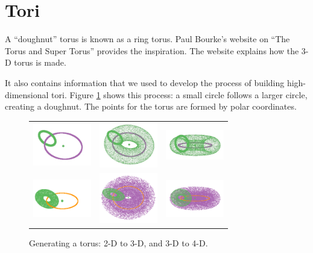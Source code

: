 \section{Tori}

A ``doughnut'' torus is known as a ring torus. Paul Bourke's website
\citep{Pa90} on ``The Torus and Super Torus'' provides the
inspiration. The website explains how the 3-D torus is made.

It also contains information that we used to develop the process of
building high-dimensional tori.  Figure \ref{ringtorus} shows this
process: a small circle follows a larger circle, creating a
doughnut. The points for the torus are formed by polar coordinates.

\begin{figure}[ht]
\centering
\begin{tabular}{c c c}
\includegraphics[width=1in]{fig/torus-ring-3-2nd-1.pdf} & \includegraphics[width=1in]{fig/torus-ring-3-2nd-2.pdf} & \includegraphics[width=1in]{fig/torus-ring-3-2nd-3.pdf}   \\ \includegraphics[width=1in]{fig/torus-rings-4-2.pdf} &\includegraphics[width=1in]{fig/torus-rings-4-with-torus-2.pdf}&\includegraphics[width=1in]{fig/torus-rings-4-with-torus-1.pdf}
\end{tabular}
\caption{Generating a torus: 2-D to 3-D, and 3-D to 4-D.}
\label{ringtorus}
\end{figure}

